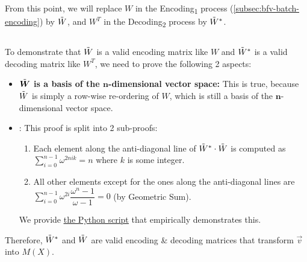 $ $

$ $

From this point, we will replace $W$ in the \textsf{Encoding\textsubscript{1}} process (\autoref{subsec:bfv-batch-encoding}) by $\tilde{W}$, and $W^T$ in the \textsf{Decoding\textsubscript{2}} process by $\tilde{W}^*$. 

$ $

To demonstrate that $\tilde{W}$ is a valid encoding matrix like $W$ and $\tilde{W}^*$ is a valid decoding matrix like $W^T$, we need to prove the following 2 aspects:
\begin{itemize}[leftmargin=3\parindent]

\item \textbf{${\tilde{\bm W}}$ is a basis of the $\bm{n}$-dimensional vector space:} This is true, because $\tilde{W}$ is simply a row-wise re-ordering of $W$, which is still a basis of the $\bm{n}$-dimensional vector space.

\item {}: This proof is split into 2 sub-proofs: 
\begin{enumerate}[leftmargin=2\parindent]
\item {} Each element along the anti-diagonal line of \boldmath$\tilde{ W}^{ *} \cdot \tilde{ W}$ is computed as $\sum\limits_{i=0}^{n-1} \omega^{2nik} = n$ where $k$ is some integer.
\item {} All other elements except for the ones along the anti-diagonal lines are $\sum\limits_{i=0}^{n-1}\omega^{2i} \dfrac{\omega^n - 1}{\omega - 1} = 0$ (by Geometric Sum). 
\end{enumerate}

We provide \href{https://github.com/fhetextbook/fhe-textbook/blob/main/source%20code/bfv_j_matrix_inverse_proof.py}{\underline{the Python script}} that empirically demonstrates this. 

\end{itemize}




Therefore, $\tilde{W}^*$ and $\tilde{W}$ are valid encoding \& decoding matrices that transform $\vec{v}$ into $M(X)$. 

$ $

